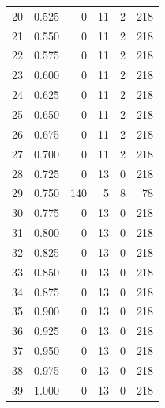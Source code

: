 \documentclass[a4paper,twoside,12pt]{book}
\begin{document}
\begin{appendices}
\begin{table}
\begin{tabular}{lrrrrr}
		20 &  0.525 &         0 &        11 &               2 &             218 \\
		21 &  0.550 &         0 &        11 &               2 &             218 \\
		22 &  0.575 &         0 &        11 &               2 &             218 \\
		23 &  0.600 &         0 &        11 &               2 &             218 \\
		24 &  0.625 &         0 &        11 &               2 &             218 \\
		25 &  0.650 &         0 &        11 &               2 &             218 \\
		26 &  0.675 &         0 &        11 &               2 &             218 \\
		27 &  0.700 &         0 &        11 &               2 &             218 \\
		28 &  0.725 &         0 &        13 &               0 &             218 \\
		29 &  0.750 &       140 &         5 &               8 &              78 \\
		30 &  0.775 &         0 &        13 &               0 &             218 \\
		31 &  0.800 &         0 &        13 &               0 &             218 \\
		32 &  0.825 &         0 &        13 &               0 &             218 \\
		33 &  0.850 &         0 &        13 &               0 &             218 \\
		34 &  0.875 &         0 &        13 &               0 &             218 \\
		35 &  0.900 &         0 &        13 &               0 &             218 \\
		36 &  0.925 &         0 &        13 &               0 &             218 \\
		37 &  0.950 &         0 &        13 &               0 &             218 \\
		38 &  0.975 &         0 &        13 &               0 &             218 \\
		39 &  1.000 &         0 &        13 &               0 &             218 \\
		\bottomrule
	\end{tabular}
\end{table}
	

\end{appendices}
\end{document}
